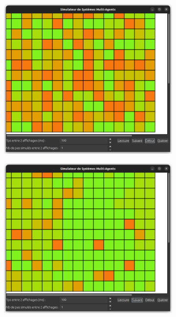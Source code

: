 \documentclass[a4paper, 11pt, french]{article}
\begin{document}
\begin{figure}[H]
\centering
\begin{subfigure}{0.3\textwidth}
    \includegraphics[width=\textwidth]{TestImmigration1.png}
\end{subfigure}
\hfill
\begin{subfigure}{0.3\textwidth}
    \includegraphics[width=\textwidth]{TestImmigration2.png}
\end{subfigure}

\end{figure}
\end{document}
